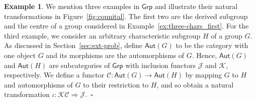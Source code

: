 \documentclass{amsart}
\newcommand{\Cat}[1]{\mathsf{#1}}
\newcommand{\cat}[1]{\Cat{#1}}
\numberwithin{lstfloat}{section}
\newcommand{\func}[1]{\mathcal{#1}}
\newcommand{\exqed}{\hfill $\square$}
\theoremstyle{definition}
\newtheorem{ex}[thm]{Example}
\theoremstyle{remark}
\numberwithin{equation}{section}
\begin{document}
\begin{ex}\label{ex:three-chars}
  We mention three examples in $\cat{Grp}$ and 
illustrate their natural transformations in 
Figure~\ref{fig:counital}. 
The first two are the derived subgroup and the centre of a group considered 
in Example~\ref{ex:three-chars_first}. For the third example, we consider an 
arbitrary characteristic subgroup $H$ of a group $G$. 
  As discussed in Section~\ref{sec:ext-prob}, define
  $\cat{Aut}(G)$ to be the category with one object $G$ and 
its morphisms are the
  automorphisms of $G$. Hence, $\cat{Aut}(G)$ and $\cat{Aut}(H)$ are
  subcategories of $\cat{Grp}$ with inclusion functors $\func{J}$ and
  $\func{K}$, respectively. We define a functor $\func{C} : \cat{Aut}(G) \to
  \cat{Aut}(H)$ by mapping $G$ to $H$ and automorphisms of $G$ to their
  restriction to $H$, and so obtain a natural transformation $\iota :
  \func{K}\func{C} \Rightarrow \func{J}$.~\exqed
\end{ex}

  
\end{document}
